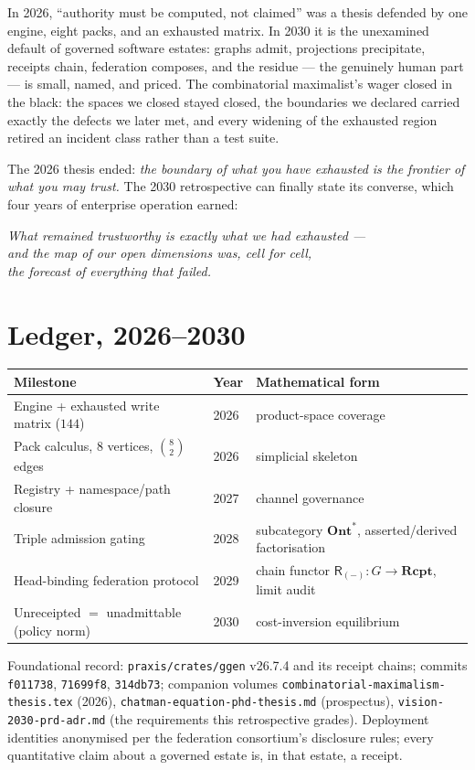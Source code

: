 \documentclass[11pt,a4paper]{report}
\theoremstyle{definition}
\theoremstyle{remark}
\newcommand{\Ont}{\mathbf{Ont}}
\newcommand{\Rcpt}{\mathbf{Rcpt}}
\newcommand{\rec}{\mathsf{R}}
\begin{document}
In 2026, ``authority must be computed, not claimed'' was a thesis defended
by one engine, eight packs, and an exhausted matrix. In 2030 it is the
unexamined default of governed software estates: graphs admit, projections
precipitate, receipts chain, federation composes, and the residue --- the
genuinely human part --- is small, named, and priced. The combinatorial
maximalist's wager closed in the black: the spaces we closed stayed closed,
the boundaries we declared carried exactly the defects we later met, and
every widening of the exhausted region retired an incident class rather
than a test suite.

The 2026 thesis ended: \emph{the boundary of what you have exhausted is the
frontier of what you may trust.} The 2030 retrospective can finally state
its converse, which four years of enterprise operation earned:

\begin{center}
\emph{What remained trustworthy is exactly what we had exhausted ---\\
and the map of our open dimensions was, cell for cell,\\
the forecast of everything that failed.}
\end{center}

\appendix
\chapter{Ledger, 2026--2030}

\begin{center}
\begin{tabular}{@{}lll@{}}
\toprule
Milestone & Year & Mathematical form \\
\midrule
Engine + exhausted write matrix ($144$) & 2026 & product-space coverage \\
Pack calculus, $8$ vertices, $\binom{8}{2}$ edges & 2026 & simplicial skeleton \\
Registry + namespace/path closure & 2027 & channel governance \\
Triple admission gating & 2028 & subcategory $\Ont^{*}$, asserted/derived factorisation \\
Head-binding federation protocol & 2029 & chain functor $\rec_{(-)}: G \to \Rcpt$, limit audit \\
Unreceipted $=$ unadmittable (policy norm) & 2030 & cost-inversion equilibrium \\
\bottomrule
\end{tabular}
\end{center}

\vspace{1em}
\noindent
Foundational record: \texttt{praxis/crates/ggen} v26.7.4 and its receipt
chains; commits \texttt{f011738}, \texttt{71699f8}, \texttt{314db73};
companion volumes \texttt{combinatorial-maximalism-thesis.tex} (2026),
\texttt{chatman-equation-phd-thesis.md} (prospectus),
\texttt{vision-2030-prd-adr.md} (the requirements this retrospective
grades). Deployment identities anonymised per the federation
consortium's disclosure rules; every quantitative claim about a governed
estate is, in that estate, a receipt.
\end{document}
